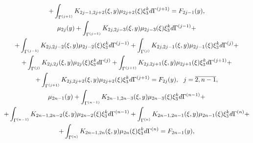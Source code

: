 \begin{gather}
+\int_{\Gamma^{(j+1)}}K_{2j-1,2j+2}(\xi,y)\mu_{2j+2}(\xi)\xi_3^k


d\Gamma^{(j+1)}=F_{2j-1}(y), \notag \\


%


\mu_{2j}(y)+\int


_{\Gamma^{(j-1)}}K_{2j,2j-3}(\xi,y)\mu_{2j-3}(\xi)\xi_3^k


d\Gamma^{(j-1)}+\notag \\


+\int_{\Gamma^{(j-1)}}K_{2j,2j-2}(\xi,y)\mu_{2j-2}(\xi)\xi_3^k


d\Gamma^{(j-1)}+\int


_{\Gamma^{(j)}}K_{2j,2j-1}(\xi,y)\mu_{2j-1}(\xi)\xi_3^k


d\Gamma^{(j)}+\notag \\


%


+\int_{\Gamma^{(j)}}K_{2j,2j}(\xi,y)\mu_{2j}(\xi)\xi_3^k


d\Gamma^{(j)}+\int


_{\Gamma^{(j+1)}}K_{2j,2j+1}(\xi,y)\mu_{2j+1}(\xi)\xi_3^k


d\Gamma^{(j+1)}+\notag \\


+\int_{\Gamma^{(j+1)}}K_{2j,2j+2}(\xi,y)\mu_{2j+2}(\xi)\xi_3^k


d\Gamma^{(j+1)}=F_{2j}(y),\ \ j=\overline{2,n-1},\notag \\


%


\mu_{2n-1}(y)+\int


_{\Gamma^{(n-1)}}K_{2n-1,2n-3}(\xi,y)\mu_{2n-3}(\xi)\xi_3^k


d\Gamma^{(n-1)}+ \notag \\


%


+\int_{\Gamma^{(n-1)}}K_{2n-1,2n-2}(\xi,y)\mu_{2n-2}(\xi)\xi_3^k


d\Gamma^{(n-1)}+\int


_{\Gamma^{(n)}}K_{2n-1,2n-1}(\xi,y)\mu_{2n-1}(\xi)\xi_3^k


d\Gamma^{(n)}+ \notag \\


%


+\int_{\Gamma^{(n)}}K_{2n-1,2n}(\xi,y)\mu_{2n}(\xi)\xi_3^k


d\Gamma^{(n)}=F_{2n-1}(y),\notag \\


%



\end{gather}
